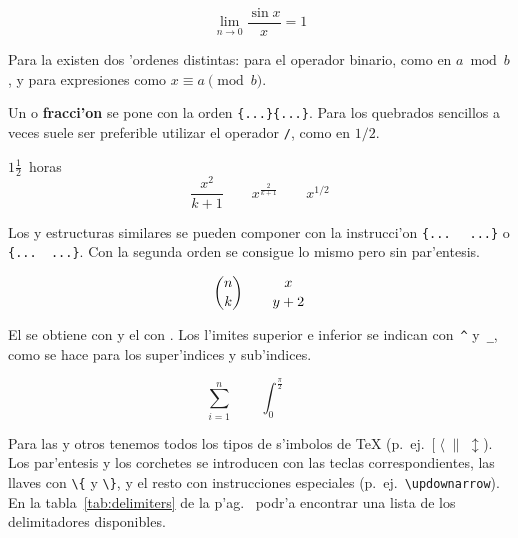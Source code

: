 \begin{example}
\[\lim_{n \rightarrow 0}
\frac{\sin x}{x}=1\]
\end{example}

Para la  existen dos 'ordenes distintas:
 para el operador binario, como en $a \bmod b$, y
 para expresiones como $x\equiv a \pmod{b}$.

Un \textbf{} o
\textbf{fracci'on} se pone con la orden
\verb|{...}{...}|. Para los quebrados sencillos a veces
suele ser preferible utilizar el operador \verb|/|, %
como en $1/2$.
\begin{example}
$1\frac{1}{2}$~horas
\begin{displaymath}
\frac{ x^{2} }{ k+1 }\qquad
x^{ \frac{2}{k+1} }\qquad
x^{ 1/2 }
\end{displaymath}
\end{example}

Los \textbf{} y estructuras similares
se pueden componer con la instrucci'on \verb|{... |%
\verb| ...}| o \verb|{... |\verb| ...}|. Con la segunda orden se
consigue lo mismo pero sin par'entesis.

\begin{example}
\begin{displaymath}
{n \choose k}\qquad {x \atop y+2}
\end{displaymath}
\end{example}
 
\medskip

El \textbf{} se obtiene con  y el
\textbf{} con . Los l'imites superior e
inferior se indican con~\verb|^| y~\verb|_|, como se hace para los
super'indices y sub'indices.

\begin{example}
\begin{displaymath}
\sum_{i=1}^{n} \qquad
\int_{0}^{\frac{\pi}{2}} \qquad
\end{displaymath}
\end{example}

Para las \textbf{} y otros  tenemos todos
los tipos de s'imbolos de \TeX{}
(p.~ej.~$[\;\langle\;\|\;\updownarrow$).  Los par'entesis y los
corchetes se introducen con las teclas correspondientes, las llaves
con \verb|\{| y \verb|\}|, y el resto con instrucciones especiales
(p.~ej.~\verb|\updownarrow|). En la tabla~\ref{tab:delimiters} de la
p'ag.~\pageref{tab:delimiters} podr'a encontrar una lista de los
delimitadores disponibles.

